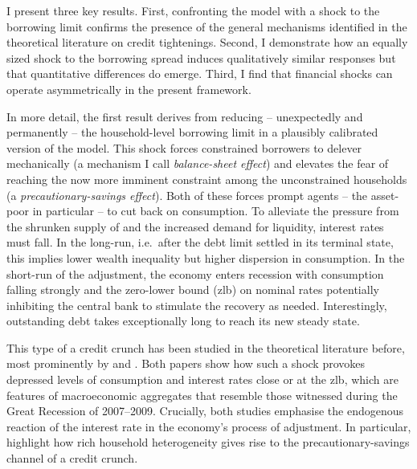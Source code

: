 \documentclass[a4paper,12pt]{article} %
\numberwithin{equation}{section} %
\numberwithin{figure}{section}
\numberwithin{table}{section}
\begin{document}
I present three key results. First, confronting the model with a shock to the borrowing limit confirms the presence of the general mechanisms identified in the theoretical literature on credit tightenings. Second, I demonstrate how an equally sized shock to the borrowing spread induces qualitatively similar responses but that quantitative differences do emerge. Third, I find that financial shocks can operate asymmetrically in the present framework.

In more detail, the first result derives from reducing -- unexpectedly and permanently -- the household-level borrowing limit in a plausibly calibrated version of the model. This shock forces constrained borrowers to delever mechanically (a mechanism I call \textit{balance-sheet effect}) and elevates the fear of reaching the now more imminent constraint among the unconstrained households (a \textit{precautionary-savings effect}). Both of these forces prompt agents -- the asset-poor in particular -- to cut back on consumption. To alleviate the pressure from the shrunken supply of and the increased demand for liquidity, interest rates must fall. In the long-run, i.e.~after the debt limit settled in its terminal state, this implies lower wealth inequality but higher dispersion in consumption. In the short-run of the adjustment, the economy enters recession with consumption falling strongly and the zero-lower bound (\Gls{zlb}) on nominal rates potentially inhibiting the central bank to stimulate the recovery as needed. Interestingly, outstanding debt takes exceptionally long to reach its new steady state.


This type of a credit crunch has been studied in the theoretical literature before, most prominently by \textcite{egg2012} and \textcite{gl2017}. Both papers show how such a shock provokes depressed levels of consumption and interest rates close or at the \Gls{zlb}, which are features of macroeconomic aggregates that resemble those witnessed during the Great Recession of 2007--2009. Crucially, both studies emphasise the endogenous reaction of the interest rate in the economy's process of adjustment. In particular, \textcite{gl2017} highlight how rich household heterogeneity gives rise to the precautionary-savings channel of a credit crunch.
\end{document}
